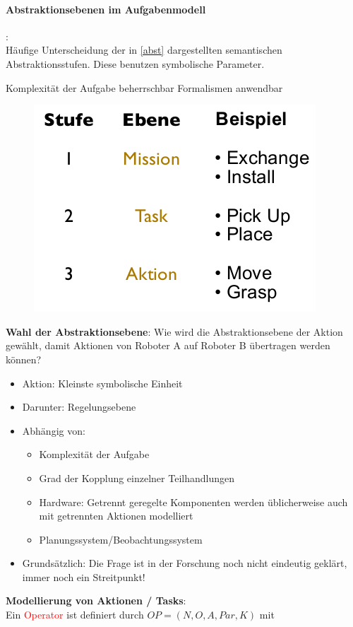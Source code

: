 \paragraph*{Abstraktionsebenen im Aufgabenmodell}:\\
Häufige Unterscheidung der in \autoref{abst} dargestellten semantischen Abstraktionsstufen. Diese benutzen symbolische Parameter.
\begin{itemize}
\ita Komplexität der Aufgabe beherrschbar
\ita Formalismen anwendbar
\end{itemize}
\begin{figure}[h!]\centering 
\includegraphics[width=0.3\linewidth]{figures/ch02_abst.png}
\caption{}
\label{abst}
\end{figure}
\textbf{Wahl der Abstraktionsebene}: Wie wird die Abstraktionsebene der Aktion gewählt, damit Aktionen von Roboter A auf Roboter B übertragen werden können?
\begin{itemize}
\item Aktion: Kleinste symbolische Einheit
\item Darunter: Regelungsebene
\item Abhängig von:
\begin{itemize}
\item Komplexität der Aufgabe
\item Grad der Kopplung einzelner Teilhandlungen
\item Hardware: Getrennt geregelte Komponenten werden üblicherweise auch mit getrennten Aktionen modelliert
\item Planungssystem/Beobachtungssystem
\end{itemize}
\item Grundsätzlich: Die Frage ist in der Forschung noch nicht eindeutig geklärt, immer noch ein Streitpunkt!
\end{itemize}
\textbf{Modellierung von Aktionen / Tasks}:\\
Ein \textcolor{red}{Operator} ist definiert durch $OP = (N, O, A, Par, K)$ mit
